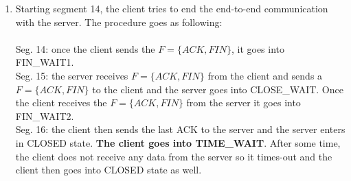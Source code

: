 \documentclass[a4paper]{article}
\begin{document}
\begin{enumerate}[label=(\alph*)]
    \item Starting segment 14, the client tries to end the end-to-end communication with the server. The procedure goes as following:\\ \\
    Seg. 14: once the client sends the $F=\{ACK, FIN\}$, it goes into FIN\_WAIT1.\\
    Seg. 15: the server receives $F=\{ACK, FIN\}$ from the client and sends a $F=\{ACK, FIN\}$ to the client and the server goes into CLOSE\_WAIT. Once the client receives the $F=\{ACK, FIN\}$ from the server it goes into FIN\_WAIT2.\\
    Seg. 16: the client then sends the last ACK to the server and the server enters in CLOSED state. \textbf{The client goes into TIME\_WAIT}. After some time, the client does not receive any data from the server so it times-out and the client then goes into CLOSED state as well. 
\end{enumerate}
\end{document}
